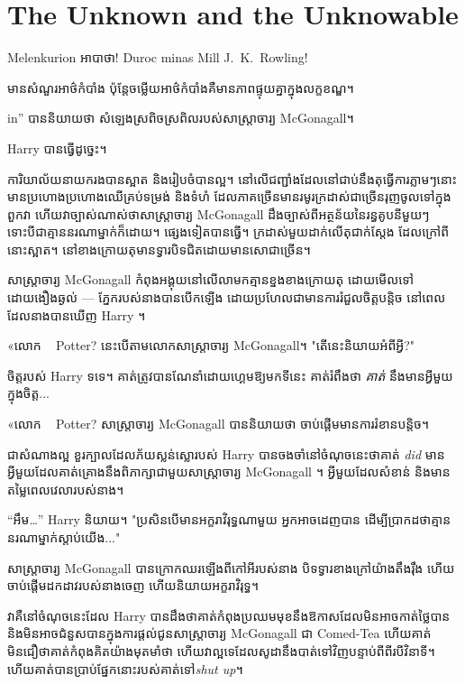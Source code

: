 \chapter{The Unknown and the Unknowable}

\begin{chapterOpeningAuthorNote}
Melenkurion អាបាថា! Duroc minas Mill J.~K.~Rowling!
\end{chapterOpeningAuthorNote}
\begin{chapterOpeningQuote}
មាន​សំណួរ​អាថ៌កំបាំង ប៉ុន្តែ​ចម្លើយ​អាថ៌កំបាំង​គឺ​មាន​ភាព​ផ្ទុយ​គ្នា​ក្នុង​លក្ខខណ្ឌ។
\end{chapterOpeningQuote}

 in” បាននិយាយថា សំឡេងស្រពិចស្រពិលរបស់សាស្រ្តាចារ្យ McGonagall។

\hplettrineextrapara
Harry បានធ្វើដូច្នេះ។

ការិយាល័យនាយករងបានស្អាត និងរៀបចំបានល្អ។ នៅលើជញ្ជាំងដែលនៅជាប់នឹងតុធ្វើការភ្លាមៗនោះ មានប្រហោងប្រហោងឈើគ្រប់ទម្រង់ និងទំហំ ដែលភាគច្រើនមានរមូរក្រដាស់ជាច្រើនរុញចូលទៅក្នុងពួកវា ហើយវាច្បាស់ណាស់ថាសាស្រ្តាចារ្យ McGonagall ដឹងច្បាស់ពីអត្ថន័យនៃរន្ធគូបនីមួយៗ ទោះបីជាគ្មាននរណាម្នាក់ក៏ដោយ។ ផ្សេងទៀតបានធ្វើ។ ក្រដាស់មួយដាក់លើតុជាក់ស្តែង ដែលក្រៅពីនោះស្អាត។ នៅ​ខាងក្រោយ​តុ​មាន​ទ្វារ​បិទ​ជិត​ដោយ​មាន​សោ​ជាច្រើន​។

សាស្ត្រាចារ្យ McGonagall កំពុងអង្គុយនៅលើលាមកគ្មានខ្នងខាងក្រោយតុ ដោយមើលទៅដោយងឿងឆ្ងល់ — ភ្នែករបស់នាងបានបើកឡើង ដោយប្រហែលជាមានការរំជួលចិត្តបន្តិច នៅពេលដែលនាងបានឃើញ Harry ។

«លោក ~ Potter? នេះ​បើ​តាម​លោក​សាស្ត្រាចារ្យ McGonagall។ "តើនេះនិយាយអំពីអ្វី?"

ចិត្តរបស់ Harry ទទេ។ គាត់ត្រូវបានណែនាំដោយហ្គេមឱ្យមកទីនេះ គាត់រំពឹងថា \emph{គាត់} នឹងមានអ្វីមួយក្នុងចិត្ត...

«លោក ~ Potter? សាស្ត្រាចារ្យ McGonagall បាន​និយាយ​ថា ចាប់​ផ្ដើម​មាន​ការ​រំខាន​បន្តិច។

ជាសំណាងល្អ ខួរក្បាលដែលភ័យស្លន់ស្លោរបស់ Harry បានចងចាំនៅចំណុចនេះថាគាត់ \emph{did} មានអ្វីមួយដែលគាត់គ្រោងនឹងពិភាក្សាជាមួយសាស្រ្តាចារ្យ McGonagall ។ អ្វីមួយដែលសំខាន់ និងមានតម្លៃពេលវេលារបស់នាង។

“អឹម…” Harry និយាយ។ "ប្រសិនបើមានអក្ខរាវិរុទ្ធណាមួយ អ្នកអាចដេញបាន ដើម្បីប្រាកដថាគ្មាននរណាម្នាក់ស្តាប់យើង..."

សាស្ត្រាចារ្យ McGonagall បានក្រោកឈរឡើងពីកៅអីរបស់នាង បិទទ្វារខាងក្រៅយ៉ាងតឹងរ៉ឹង ហើយចាប់ផ្តើមដកដាវរបស់នាងចេញ ហើយនិយាយអក្ខរាវិរុទ្ធ។

វាគឺនៅចំណុចនេះដែល Harry បានដឹងថាគាត់កំពុងប្រឈមមុខនឹងឱកាសដែលមិនអាចកាត់ថ្លៃបាន និងមិនអាចជំនួសបានក្នុងការផ្តល់ជូនសាស្រ្តាចារ្យ McGonagall ជា Comed-Tea ហើយគាត់មិនជឿថាគាត់កំពុងគិតយ៉ាងមុតមាំថា ហើយវាល្អទេដែលសូដានឹងបាត់ទៅវិញបន្ទាប់ពីពីរបីវិនាទី។ ហើយគាត់បានប្រាប់ផ្នែកនោះរបស់គាត់ទៅ\emph{shut up}។

